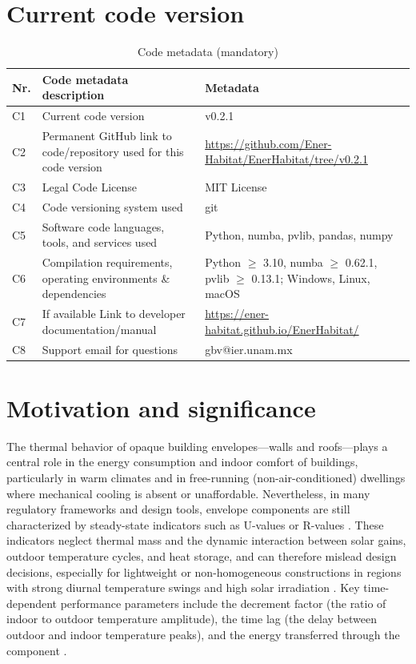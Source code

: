 \documentclass[preprint,12pt, a4paper]{elsarticle}
\begin{document}
\section*{Current code version}

\begin{table}[!h]
\begin{tabular}{|l|p{6.5cm}|p{6.5cm}|}
\hline
\textbf{Nr.} & \textbf{Code metadata description} & \textbf{Metadata} \\
\hline
C1 & Current code version & v0.2.1 \\
\hline
C2 & Permanent GitHub link to code/repository used for this code version & \url{https://github.com/Ener-Habitat/EnerHabitat/tree/v0.2.1} \\
\hline
C3 & Legal Code License & MIT License \\
\hline
C4 & Code versioning system used & git \\
\hline
C5 & Software code languages, tools, and services used & Python, numba, pvlib, pandas, numpy \\
\hline
C6 & Compilation requirements, operating environments \& dependencies & Python $\geq$ 3.10, numba $\geq$ 0.62.1, pvlib $\geq$ 0.13.1; Windows, Linux, macOS \\
\hline
C7 & If available Link to developer documentation/manual & \url{https://ener-habitat.github.io/EnerHabitat/} \\
\hline
C8 & Support email for questions & gbv@ier.unam.mx \\
\hline
\end{tabular}
\caption{Code metadata (mandatory)}
\label{codeMetadata}
\end{table}

\section{Motivation and significance}

The thermal behavior of opaque building envelopes---walls and roofs---plays a central role in the energy consumption and indoor comfort of buildings, particularly in warm climates and in free-running (non-air-conditioned) dwellings where mechanical cooling is absent or unaffordable. Nevertheless, in many regulatory frameworks and design tools, envelope components are still characterized by steady-state indicators such as U-values or R-values \cite{ashrae2021fundamentals}. These indicators neglect thermal mass and the dynamic interaction between solar gains, outdoor temperature cycles, and heat storage, and can therefore mislead design decisions, especially for lightweight or non-homogeneous constructions in regions with strong diurnal temperature swings and high solar irradiation \cite{barrios2011wall,barrios2012envelope}. Key time-dependent performance parameters include the decrement factor (the ratio of indoor to outdoor temperature amplitude), the time lag (the delay between outdoor and indoor temperature peaks), and the energy transferred through the component \cite{barrios2012envelope}.
\end{document}

